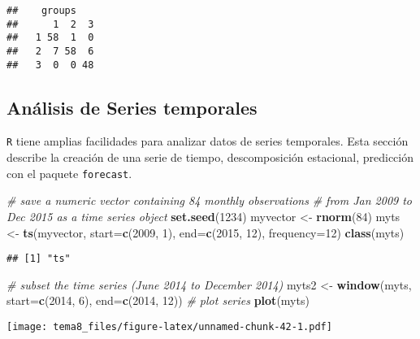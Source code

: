\documentclass[]{article}
\newenvironment{Shaded}{\begin{snugshade}}{\end{snugshade}}
\newcommand{\KeywordTok}[1]{\textcolor[rgb]{0.13,0.29,0.53}{\textbf{{#1}}}}
\newcommand{\DataTypeTok}[1]{\textcolor[rgb]{0.13,0.29,0.53}{{#1}}}
\newcommand{\DecValTok}[1]{\textcolor[rgb]{0.00,0.00,0.81}{{#1}}}
\newcommand{\StringTok}[1]{\textcolor[rgb]{0.31,0.60,0.02}{{#1}}}
\newcommand{\CommentTok}[1]{\textcolor[rgb]{0.56,0.35,0.01}{\textit{{#1}}}}
\newcommand{\NormalTok}[1]{{#1}}
\numberwithin{equation}{section}
\begin{document}
\begin{verbatim}
##    groups
##      1  2  3
##   1 58  1  0
##   2  7 58  6
##   3  0  0 48
\end{verbatim}

\subsection{Análisis de Series
temporales}\label{analisis-de-series-temporales}

\texttt{R} tiene amplias facilidades para analizar datos de series
temporales. Esta sección describe la creación de una serie de tiempo,
descomposición estacional, predicción con el paquete \texttt{forecast}.

\begin{Shaded}
\begin{Highlighting}[]
\CommentTok{# save a numeric vector containing 84 monthly observations}
\CommentTok{# from Jan 2009 to Dec 2015 as a time series object}
\KeywordTok{set.seed}\NormalTok{(}\DecValTok{1234}\NormalTok{)}
\NormalTok{myvector <-}\StringTok{ }\KeywordTok{rnorm}\NormalTok{(}\DecValTok{84}\NormalTok{) }
\NormalTok{myts <-}\StringTok{ }\KeywordTok{ts}\NormalTok{(myvector, }\DataTypeTok{start=}\KeywordTok{c}\NormalTok{(}\DecValTok{2009}\NormalTok{, }\DecValTok{1}\NormalTok{), }\DataTypeTok{end=}\KeywordTok{c}\NormalTok{(}\DecValTok{2015}\NormalTok{, }\DecValTok{12}\NormalTok{), }\DataTypeTok{frequency=}\DecValTok{12}\NormalTok{)}
\KeywordTok{class}\NormalTok{(myts)}
\end{Highlighting}
\end{Shaded}

\begin{verbatim}
## [1] "ts"
\end{verbatim}

\begin{Shaded}
\begin{Highlighting}[]
\CommentTok{# subset the time series (June 2014 to December 2014)}
\NormalTok{myts2 <-}\StringTok{ }\KeywordTok{window}\NormalTok{(myts, }\DataTypeTok{start=}\KeywordTok{c}\NormalTok{(}\DecValTok{2014}\NormalTok{, }\DecValTok{6}\NormalTok{), }\DataTypeTok{end=}\KeywordTok{c}\NormalTok{(}\DecValTok{2014}\NormalTok{, }\DecValTok{12}\NormalTok{))}
\CommentTok{# plot series}
\KeywordTok{plot}\NormalTok{(myts)}
\end{Highlighting}
\end{Shaded}

\texttt{[image: tema8\_files/figure-latex/unnamed-chunk-42-1.pdf]}
\end{document}
